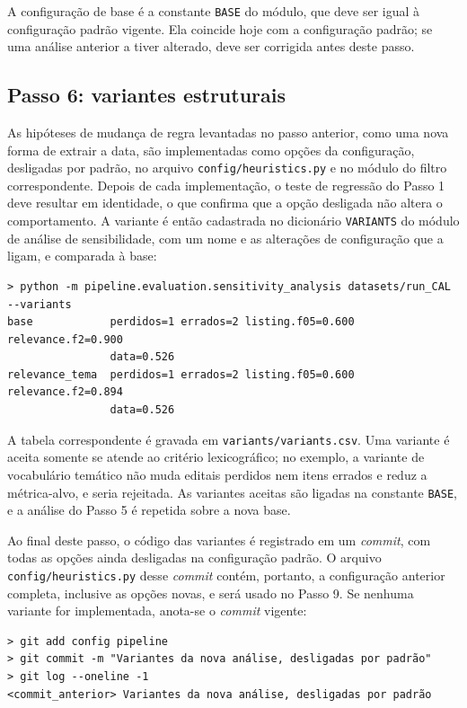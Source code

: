 A configuração de base é a constante \texttt{BASE} do módulo, que deve ser
igual à configuração padrão vigente. Ela coincide hoje com a configuração
padrão; se uma análise anterior a tiver alterado, deve ser corrigida antes deste
passo.

\subsection{Passo 6: variantes estruturais}

As hipóteses de mudança de regra levantadas no passo anterior, como uma nova
forma de extrair a data, são implementadas como opções da configuração,
desligadas por padrão, no arquivo \texttt{config/heuristics.py} e no módulo do
filtro correspondente. Depois de cada implementação, o teste de regressão do
Passo 1 deve resultar em identidade, o que confirma que a opção desligada não
altera o comportamento. A variante é então cadastrada no dicionário
\texttt{VARIANTS} do módulo de análise de sensibilidade, com um nome e as
alterações de configuração que a ligam, e comparada à base:

\begin{footnotesize}
\begin{verbatim}
> python -m pipeline.evaluation.sensitivity_analysis datasets/run_CAL --variants
base            perdidos=1 errados=2 listing.f05=0.600 relevance.f2=0.900
                data=0.526
relevance_tema  perdidos=1 errados=2 listing.f05=0.600 relevance.f2=0.894
                data=0.526
\end{verbatim}
\end{footnotesize}

A tabela correspondente é gravada em \texttt{variants/variants.csv}. Uma
variante é aceita somente se atende ao critério lexicográfico; no exemplo, a
variante de vocabulário temático não muda editais perdidos nem itens errados e
reduz a métrica-alvo, e seria rejeitada. As variantes aceitas são ligadas na
constante \texttt{BASE}, e a análise do Passo 5 é repetida sobre a nova base.

Ao final deste passo, o código das variantes é registrado em um
\textit{commit}, com todas as opções ainda desligadas na configuração padrão.
O arquivo \texttt{config/heuristics.py} desse \textit{commit} contém, portanto,
a configuração anterior completa, inclusive as opções novas, e será usado no
Passo 9. Se nenhuma variante for implementada, anota-se o \textit{commit}
vigente:

\begin{footnotesize}
\begin{verbatim}
> git add config pipeline
> git commit -m "Variantes da nova análise, desligadas por padrão"
> git log --oneline -1
<commit_anterior> Variantes da nova análise, desligadas por padrão
\end{verbatim}
\end{footnotesize}

